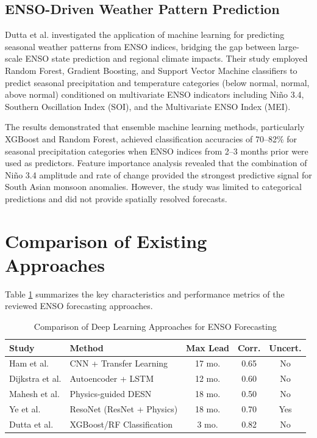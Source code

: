 \subsection{ENSO-Driven Weather Pattern Prediction}

Dutta et al. \cite{dutta2024seasonal} investigated the application of machine learning for predicting seasonal weather patterns from ENSO indices, bridging the gap between large-scale ENSO state prediction and regional climate impacts. Their study employed Random Forest, Gradient Boosting, and Support Vector Machine classifiers to predict seasonal precipitation and temperature categories (below normal, normal, above normal) conditioned on multivariate ENSO indicators including Ni\~{n}o 3.4, Southern Oscillation Index (SOI), and the Multivariate ENSO Index (MEI).

The results demonstrated that ensemble machine learning methods, particularly XGBoost and Random Forest, achieved classification accuracies of 70--82\% for seasonal precipitation categories when ENSO indices from 2--3 months prior were used as predictors. Feature importance analysis revealed that the combination of Ni\~{n}o 3.4 amplitude and rate of change provided the strongest predictive signal for South Asian monsoon anomalies. However, the study was limited to categorical predictions and did not provide spatially resolved forecasts.

\section{Comparison of Existing Approaches}

Table \ref{tab:lit_comparison} summarizes the key characteristics and performance metrics of the reviewed ENSO forecasting approaches.

\begin{table}[ht]
\centering
\caption{Comparison of Deep Learning Approaches for ENSO Forecasting}
\label{tab:lit_comparison}
\small
\begin{tabular}{|l|l|c|c|c|}
\hline
\textbf{Study} & \textbf{Method} & \textbf{Max Lead} & \textbf{Corr.} & \textbf{Uncert.} \\
\hline
Ham et al. \cite{ham2019deep} & CNN + Transfer Learning & 17 mo. & 0.65 & No \\
\hline
Dijkstra et al. \cite{dijkstra2019deep} & Autoencoder + LSTM & 12 mo. & 0.60 & No \\
\hline
Mahesh et al. \cite{mahesh2024physics} & Physics-guided DESN & 18 mo. & 0.50 & No \\
\hline
Ye et al. \cite{ye2024resonet} & ResoNet (ResNet + Physics) & 18 mo. & 0.70 & Yes \\
\hline
Dutta et al. \cite{dutta2024seasonal} & XGBoost/RF Classification & 3 mo. & 0.82 & No \\
\hline
\end{tabular}
\end{table}



